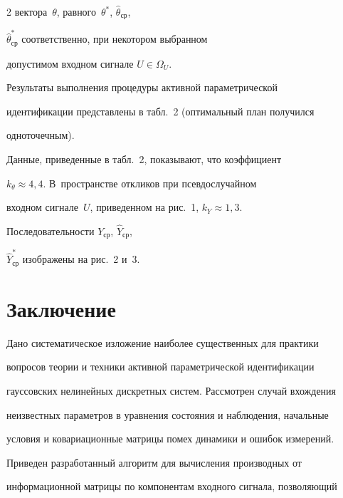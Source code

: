\begin{multicols}{2}
вектора~$\theta$, равного~$\theta^*$, $\hat{\theta}_{\mathrm{ср}}$,


$\hat{\theta}_{\mathrm{ср}}^*$ соответственно, при некотором выбранном


допустимом входном сигнале $U\in \Omega_U$.





  Результаты выполнения процедуры активной параметрической


идентификации представлены в табл.~2 (оптимальный план получился


одноточечным).








  Данные, приведенные в табл.~2, показывают, что коэффициент


$k_\theta\approx 4{,}4$. В~пространстве откликов при псевдослучайном


входном сигнале~$U$, приведенном на рис.~1, $k_Y\approx 1{,}3$.


Последовательности $Y_{\mathrm{ср}}$,  $\hat{Y}_{\mathrm{ср}}$,


$\hat{Y}^*_{\mathrm{ср}}$ изображены на рис.~2 и~3.














\section{Заключение}





  Дано систематическое изложение наиболее существенных для практики


вопросов теории и техники активной параметрической идентификации


гауссовских нелинейных дискретных систем. Рассмотрен случай вхождения


неизвестных параметров в уравнения состояния и наблюдения, начальные


условия и ковариационные матрицы помех динамики и ошибок измерений.


Приведен разработанный алгоритм для вычисления производных от


информационной матрицы по компонентам входного сигнала, позволяющий



\end{multicols}
